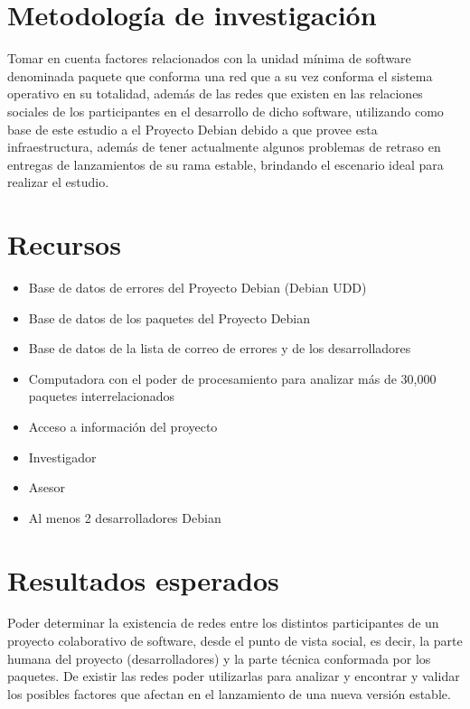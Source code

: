 \documentclass[letterpaper,12pt,titlepage]{report}
\begin{document}
\chapter{Metodología de investigación} %
Tomar en cuenta factores relacionados con la unidad mínima de software
denominada paquete que conforma una red que a su vez conforma el
sistema operativo en su totalidad, además de las redes que existen en
las relaciones sociales de los participantes en el desarrollo de dicho
software, utilizando como base de este estudio a el Proyecto Debian
debido a que provee esta infraestructura, además de tener actualmente
algunos problemas de retraso en entregas de lanzamientos de su rama
estable, brindando el escenario ideal para realizar el estudio.

\chapter{Recursos}
\begin{itemize}
\item Base de datos de errores del Proyecto Debian (Debian UDD)
\item Base de datos de los paquetes del Proyecto Debian
\item Base de datos de la lista de correo de errores y de los
  desarrolladores
\item Computadora con el poder de procesamiento para analizar más de
  30,000 paquetes interrelacionados
\item Acceso a información del proyecto
\item Investigador
\item Asesor
\item Al menos 2 desarrolladores Debian
\end{itemize}

\chapter{Resultados esperados}
Poder determinar la existencia de redes entre los distintos
participantes de un proyecto colaborativo de software, desde el punto
de vista social, es decir, la parte humana del proyecto
(desarrolladores) y la parte técnica conformada por los paquetes. De
existir las redes poder utilizarlas para analizar y encontrar y
validar los posibles factores que afectan en el lanzamiento de una
nueva versión estable.
\end{document}
